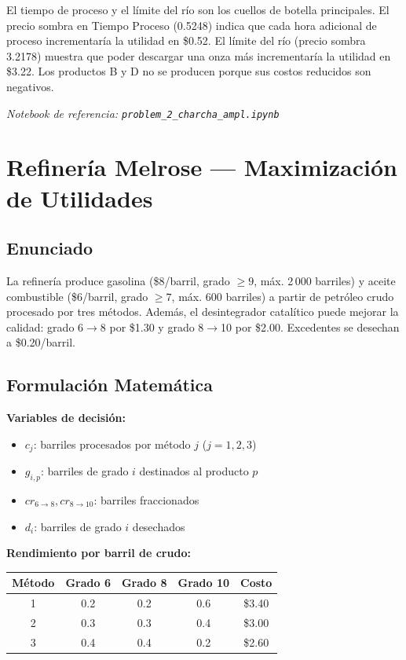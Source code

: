 \documentclass[12pt,a4paper]{article}
\begin{document}
El tiempo de proceso y el límite del río son los cuellos de botella principales. El precio sombra en Tiempo Proceso (0.5248) indica que cada hora adicional de proceso incrementaría la utilidad en \$0.52. El límite del río (precio sombra 3.2178) muestra que poder descargar una onza más incrementaría la utilidad en \$3.22. Los productos B y D no se producen porque sus costos reducidos son negativos.

\textit{Notebook de referencia: \texttt{problem\_2\_charcha\_ampl.ipynb}}

\newpage

\section{Refinería Melrose --- Maximización de Utilidades}

\subsection{Enunciado}

La refinería produce gasolina (\$8/barril, grado $\geq 9$, máx. 2\,000 barriles) y aceite combustible (\$6/barril, grado $\geq 7$, máx. 600 barriles) a partir de petróleo crudo procesado por tres métodos. Además, el desintegrador catalítico puede mejorar la calidad: grado 6$\to$8 por \$1.30 y grado 8$\to$10 por \$2.00. Excedentes se desechan a \$0.20/barril.

\subsection{Formulación Matemática}

\textbf{Variables de decisión:}
\begin{itemize}[nosep]
    \item $c_j$: barriles procesados por método $j$ ($j=1,2,3$)
    \item $g_{i,p}$: barriles de grado $i$ destinados al producto $p$
    \item $cr_{6\to8}, cr_{8\to10}$: barriles fraccionados
    \item $d_i$: barriles de grado $i$ desechados
\end{itemize}

\textbf{Rendimiento por barril de crudo:}

\begin{table}[h]
\centering
\begin{tabular}{ccccc}
\toprule
\textbf{Método} & \textbf{Grado 6} & \textbf{Grado 8} & \textbf{Grado 10} & \textbf{Costo} \\
\midrule
1 & 0.2 & 0.2 & 0.6 & \$3.40 \\
2 & 0.3 & 0.3 & 0.4 & \$3.00 \\
3 & 0.4 & 0.4 & 0.2 & \$2.60 \\
\bottomrule
\end{tabular}
\end{table}
\end{document}
